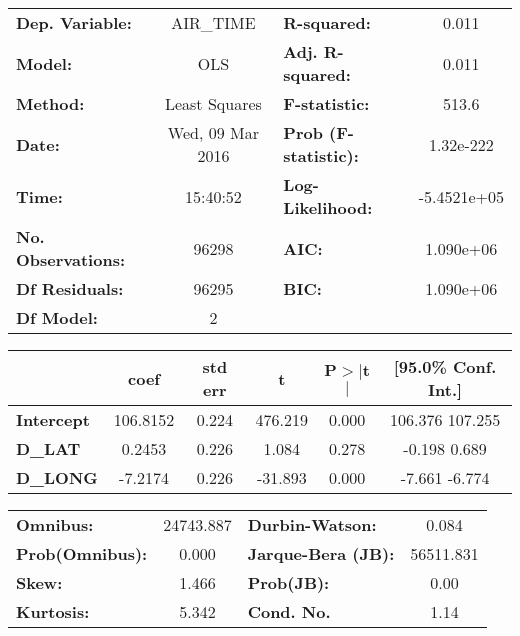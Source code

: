 \begin{center}
\begin{tabular}{lclc}
\toprule
\textbf{Dep. Variable:}    &     AIR_TIME     & \textbf{  R-squared:         } &      0.011   \\
\textbf{Model:}            &       OLS        & \textbf{  Adj. R-squared:    } &      0.011   \\
\textbf{Method:}           &  Least Squares   & \textbf{  F-statistic:       } &      513.6   \\
\textbf{Date:}             & Wed, 09 Mar 2016 & \textbf{  Prob (F-statistic):} &  1.32e-222   \\
\textbf{Time:}             &     15:40:52     & \textbf{  Log-Likelihood:    } & -5.4521e+05  \\
\textbf{No. Observations:} &       96298      & \textbf{  AIC:               } &  1.090e+06   \\
\textbf{Df Residuals:}     &       96295      & \textbf{  BIC:               } &  1.090e+06   \\
\textbf{Df Model:}         &           2      & \textbf{                     } &              \\
\bottomrule
\end{tabular}
\begin{tabular}{lccccc}
                   & \textbf{coef} & \textbf{std err} & \textbf{t} & \textbf{P$>$$|$t$|$} & \textbf{[95.0\% Conf. Int.]}  \\
\midrule
\textbf{Intercept} &     106.8152  &        0.224     &   476.219  &         0.000        &       106.376   107.255       \\
\textbf{D_LAT}     &       0.2453  &        0.226     &     1.084  &         0.278        &        -0.198     0.689       \\
\textbf{D_LONG}    &      -7.2174  &        0.226     &   -31.893  &         0.000        &        -7.661    -6.774       \\
\bottomrule
\end{tabular}
\begin{tabular}{lclc}
\textbf{Omnibus:}       & 24743.887 & \textbf{  Durbin-Watson:     } &     0.084  \\
\textbf{Prob(Omnibus):} &    0.000  & \textbf{  Jarque-Bera (JB):  } & 56511.831  \\
\textbf{Skew:}          &    1.466  & \textbf{  Prob(JB):          } &      0.00  \\
\textbf{Kurtosis:}      &    5.342  & \textbf{  Cond. No.          } &      1.14  \\
\bottomrule
\end{tabular}
\end{center}